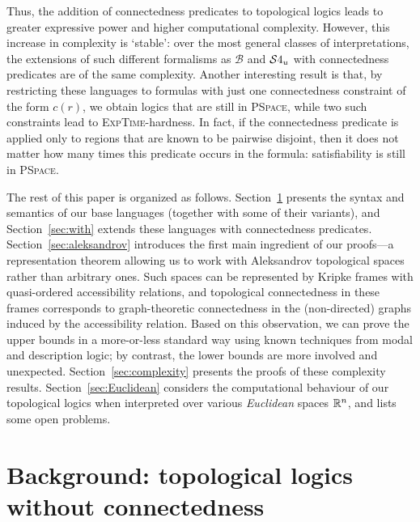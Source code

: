 \documentclass{LMCS}
\theoremstyle{plain}
\newcommand{\cB}{\ensuremath{\mathcal{B}}}\newcommand{\cBc}{\ensuremath{\mathcal{B}c}}\newcommand{\cBcc}{\ensuremath{\mathcal{B}cc}}
\newcommand{\PSpace}{\textsc{PSpace}}
\newcommand{\ExpTime}{\textsc{ExpTime}}
\begin{document}
Thus, the addition of connectedness predicates to topological logics
leads to greater expressive power and higher computational
complexity. However, this increase in complexity is `stable': over the
most general classes of interpretations, the extensions of such
different formalisms as $\cB$ and $\mathcal{S}4_u$ with connectedness predicates
are of the same complexity. Another interesting result is that, by
restricting these languages to formulas with just one connectedness
constraint of the form $c(r)$, we obtain logics that are still
in \PSpace, while two such constraints lead to \ExpTime-hardness. In
fact, if the connectedness predicate is applied only to regions that
are known to be pairwise disjoint, then it does not matter how many
times this predicate occurs in the formula: satisfiability is still
in \PSpace.

The rest of this paper is organized as
follows. Section~\ref{sec:without} presents the syntax and semantics
of our base languages (together with some of their variants), and
Section~\ref{sec:with} extends these languages with connectedness
predicates. Section~\ref{sec:aleksandrov} introduces the first main
ingredient of our proofs---a representation theorem allowing us to
work with Aleksandrov topological spaces rather than arbitrary
ones. Such spaces can be represented by Kripke frames with
quasi-ordered accessibility relations, and topological connectedness
in these frames corresponds to graph-theoretic connectedness in the
(non-directed) graphs induced by the accessibility relation.  Based on
this observation, we can prove the upper bounds in a more-or-less
standard way using known techniques from modal and description logic;
by contrast, the lower bounds are more involved and
unexpected. Section~\ref{sec:complexity} presents the proofs of these
complexity results. Section~\ref{sec:Euclidean} considers the
computational behaviour of our topological logics when interpreted
over various \emph{Euclidean} spaces $\mathbb{R}^n$, and lists some open
problems.

\section{Background: topological logics without connectedness}
\label{sec:without}
\end{document}
